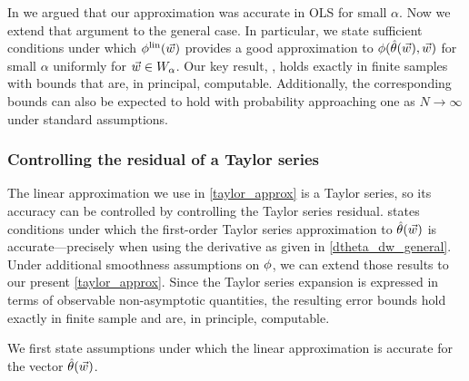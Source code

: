 In  we argued that our
approximation was accurate in OLS for small $\alpha$. Now we extend that
argument to the general case. In particular, we state sufficient conditions
under which $\phi^{\mathrm{lin}}(\vec{w})$ provides a good approximation to
$\phi(\hat{\theta}(\vec{w}), \vec{w})$ for small $\alpha$ uniformly for $\vec{w} \in
W_\alpha$.  Our key result, , holds exactly in finite
samples with bounds that are, in principal, computable. Additionally, the
corresponding bounds can also be expected to hold with probability approaching
one as $N \rightarrow \infty$ under standard assumptions.


\subsubsection{Controlling the residual of a Taylor series}

The linear approximation we use in \eqref{taylor_approx} is a Taylor series, so
its accuracy can be controlled by controlling the Taylor series residual.
\citet{giordano:2019:swiss} states conditions under which the first-order Taylor
series approximation to $\hat{\theta}(\vec{w})$ is accurate---precisely when using the
derivative as given in \eqref{dtheta_dw_general}. Under additional smoothness
assumptions on $\phi$, we can extend those results to our present
\eqref{taylor_approx}.  Since the Taylor series expansion is expressed in terms
of observable non-asymptotic quantities, the resulting error bounds hold exactly
in finite sample and are, in principle, computable.

We first state assumptions under which the linear approximation is accurate for
the vector $\hat{\theta}(\vec{w})$.

